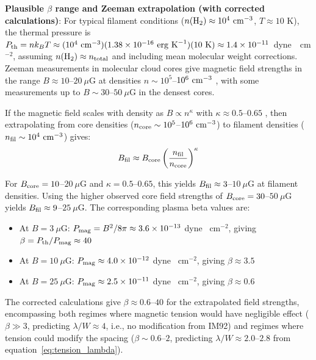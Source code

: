 \documentclass[11pt,a4paper]{article}
\begin{document}
\textbf{Plausible $\beta$ range and Zeeman extrapolation (with corrected calculations)}: For typical filament conditions ($n({\rm H_2}) \approx 10^4~{\rm cm}^{-3}$, $T \approx 10$ K), the thermal pressure is $P_{\rm th} = n k_B T \approx (10^4~{\rm cm}^{-3})(1.38\times10^{-16}~{\rm erg~K}^{-1})(10~{\rm K}) \approx 1.4\times10^{-11}$~dyne~~cm$^{-2}$, assuming $n({\rm H}_2) \approx n_{\rm total}$ and including mean molecular weight corrections. Zeeman measurements in molecular cloud cores give magnetic field strengths in the range $B \approx 10$--$20~\mu$G at densities $n \sim 10^5$--$10^6~{\rm cm}^{-3}$ \citep{Crutcher2012}, with some measurements up to $B \sim 30$--$50~\mu$G in the densest cores.

If the magnetic field scales with density as $B \propto n^{\kappa}$ with $\kappa \approx 0.5$--$0.65$ \citep{Crutcher2012}, then extrapolating from core densities ($n_{\rm core} \sim 10^5$--$10^6~{\rm cm}^{-3}$) to filament densities ($n_{\rm fil} \sim 10^4~{\rm cm}^{-3}$) gives:
\begin{equation}
B_{\rm fil} \approx B_{\rm core} \left(\frac{n_{\rm fil}}{n_{\rm core}}\right)^{\kappa}
\end{equation}

For $B_{\rm core} = 10$--$20~\mu$G and $\kappa = 0.5$--$0.65$, this yields $B_{\rm fil} \approx 3$--$10~\mu$G at filament densities. Using the higher observed core field strengths of $B_{\rm core} = 30$--$50~\mu$G yields $B_{\rm fil} \approx 9$--$25~\mu$G. The corresponding plasma beta values are:
\begin{itemize}
    \item At $B = 3~\mu$G: $P_{\rm mag} = B^2/8\pi \approx 3.6\times10^{-13}$ dyne ~cm$^{-2}$, giving $\beta = P_{\rm th}/P_{\rm mag} \approx 40$
    \item At $B = 10~\mu$G: $P_{\rm mag} \approx 4.0\times10^{-12}$ dyne ~cm$^{-2}$, giving $\beta \approx 3.5$
    \item At $B = 25~\mu$G: $P_{\rm mag} \approx 2.5\times10^{-11}$ dyne ~cm$^{-2}$, giving $\beta \approx 0.6$
\end{itemize}

The corrected calculations give $\beta \approx 0.6$--$40$ for the extrapolated field strengths, encompassing both regimes where magnetic tension would have negligible effect ($\beta \gg 3$, predicting $\lambda/W \approx 4$, i.e., no modification from IM92) and regimes where tension could modify the spacing ($\beta \sim 0.6$--$2$, predicting $\lambda/W \approx 2.0$--$2.8$ from equation~\ref{eq:tension_lambda}).
\end{document}
